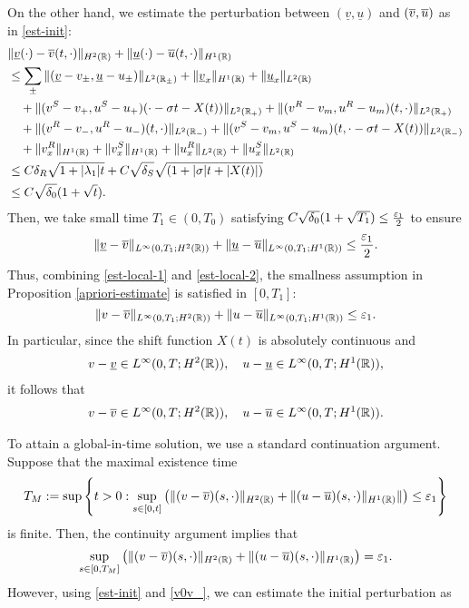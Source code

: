\documentclass[11pt,reqno]{amsart}
\begin{document}
   On the other hand,  we estimate the perturbation between $(\underline{v},\underline{u})$ and $(\overline{v},\overline{u})$ as in \eqref{est-init}:
	\begin{align*}
	&\|\underline{v}(\cdot)-\overline{v}(t,\cdot)\|_{H^2(\mathbb{R})}+\|\underline{u}(\cdot)-\overline{u}(t,\cdot)\|_{H^1(\mathbb{R})}\\
	&\le \sum_{\pm}\|(\underline{v}-v_{\pm},\underline{u}-u_{\pm})\|_{L^2(\mathbb{R}_\pm)}+\|\underline{v}_x\|_{H^1(\mathbb{R})}+\|\underline{u}_x\|_{L^2(\mathbb{R})} \\
    & \quad +\|(v^S-v_+,u^S-u_+)(\cdot-\sigma t-X(t))\|_{L^2(\mathbb{R}_+)}+\|(v^R-v_m,u^R-u_m)(t,\cdot)\|_{L^2(\mathbb{R}_+)}\\
    & \quad +\|(v^R-v_-,u^R-u_-)(t,\cdot)\|_{L^2(\mathbb{R}_-)} +\|(v^S-v_m,u^S-u_m)(t,\cdot-\sigma t-X(t))\|_{L^2(\mathbb{R}_-)}\\
	&\quad +\|v^R_x\|_{H^1(\mathbb{R})}+\|v^S_x\|_{H^1(\mathbb{R})}+\|u^R_x\|_{L^2(\mathbb{R})} +\|u^S_x\|_{L^2(\mathbb{R})}\\
	&\le C\delta_R \sqrt{1+|\lambda_1| t} + C\sqrt{\delta_S} \sqrt{(1+|\sigma| t+|X(t)|)} \\ 
    &\le C\sqrt{\delta_0}(1+\sqrt{t}).
	\end{align*}
	Then, we take small time $T_1\in(0,T_0)$ satisfying $C\sqrt{\delta_0}(1+\sqrt{T_1})\le \frac{\varepsilon_1}{2}$ to ensure
	\begin{equation}\label{est-local-2}
	\|\underline{v}-\overline{v}\|_{L^\infty(0,T_1;H^2(\mathbb{R}))}+\|\underline{u}-\overline{u}\|_{L^\infty(0,T_1;H^1(\mathbb{R}))}\le\frac{\varepsilon_1}{2}.
	\end{equation}
	Thus, combining \eqref{est-local-1} and \eqref{est-local-2}, the smallness assumption in Proposition \ref{apriori-estimate} is satisfied in $[0,T_1]$:
	\[\|v-\overline{v}\|_{L^\infty(0,T_1;H^2(\mathbb{R}))}+\|u-\overline{u}\|_{L^\infty(0,T_1;H^1(\mathbb{R}))}\le\varepsilon_1.\]
  In particular, since the shift function $X(t)$ is absolutely continuous and 
  \begin{align*}
		v-\underline{v}\in L^\infty(0,T;H^2(\mathbb R)), \quad u-\underline{u}\in L^\infty(0,T;H^1(\mathbb R)) ,
		\end{align*}
  it follows that
  \begin{align*}
		v-\overline{v}\in L^\infty(0,T;H^2(\mathbb R)), \quad u-\overline{u}\in L^\infty(0,T;H^1(\mathbb R)) .
		\end{align*}

  To attain a global-in-time solution, we use a standard continuation argument. Suppose that the maximal existence time
 \[T_M:=\sup \left\{ t>0 : \sup_{s \in [0,t]}  \left( \| (v-\overline{v})(s,\cdot) \|_{H^2(\mathbb{R})}+\|(u-\overline{u})(s,\cdot) \|_{H^1(\mathbb{R})}  \|\right) \le \varepsilon_1 \right\}\]
 is finite. Then, the continuity argument  implies that
 \begin{equation}\label{norm_TM}
 \sup_{s \in [0,T_M]} \left( \| (v-\overline{v})(s,\cdot) \|_{H^2(\mathbb{R})}+\|(u-\overline{u})(s,\cdot) \|_{H^1(\mathbb{R})} \right) =\varepsilon_1.
 \end{equation}
 However, using \eqref{est-init} and \eqref{v0v_}, we can estimate the initial perturbation as 
\end{document}
